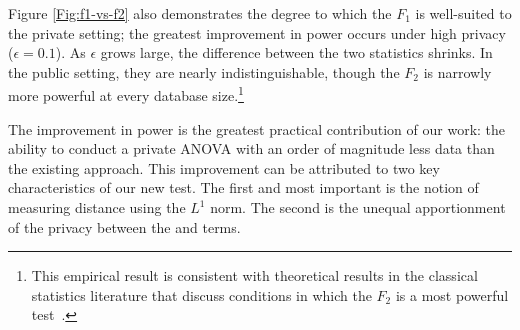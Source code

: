 Figure \ref{Fig:f1-vs-f2} also demonstrates the degree to which the $F_1$ is well-suited to the private setting; the greatest improvement in power occurs under high privacy ($\epsilon = 0.1$). As $\epsilon$ grows large, the difference between the two statistics shrinks. In the public setting, they are nearly indistinguishable, though the $F_2$ is narrowly more powerful at every database size.\footnote{This empirical result is consistent with theoretical results in the classical statistics literature that discuss conditions in which the $F_2$ is a most powerful test~\cite{cox1974theoretical}.}

The improvement in power is the greatest practical contribution of our work: the ability to conduct a private ANOVA with an order of magnitude less data than the existing approach. This improvement can be attributed to two key characteristics of our new test. The first and most important is the notion of measuring distance using the $L^1$ norm.  The second is the unequal apportionment of the privacy between the \sa and \se terms.

